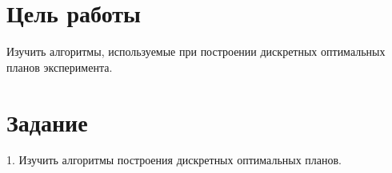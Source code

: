 ﻿%

\newcommand{\insertImage}[1]
{
	\begin{figure}[!htb] %
		\centering
		\texttt{[image: \#1]}
	\end{figure}
}

\newcommand{\insertTwoImages}[2]
{
	\begin{figure}[!htb] %
		\centering
		\texttt{[image: \#1]}
		\texttt{[image: \#2]}
	\end{figure}
}

\newcommand{\insertFourImages}[5]
{
	\begin{figure}[!htb] %
		\centering
		\texttt{[image: ../pics/plan\_Fedorov\_30\_\#1\_0.010\_\#2.png]}
		\texttt{[image: ../pics/plan\_Fedorov\_30\_\#1\_0.010\_\#3.png]}
		\texttt{[image: ../pics/plan\_Fedorov\_30\_\#1\_0.010\_\#4.png]}
		\texttt{[image: ../pics/plan\_Fedorov\_30\_\#1\_0.010\_\#5.png]}
	\end{figure}
}




\section{Цель работы}
Изучить алгоритмы, используемые при построении дискретных оптимальных планов эксперимента.


\section{Задание}

1.	Изучить алгоритмы построения дискретных оптимальных планов. 

